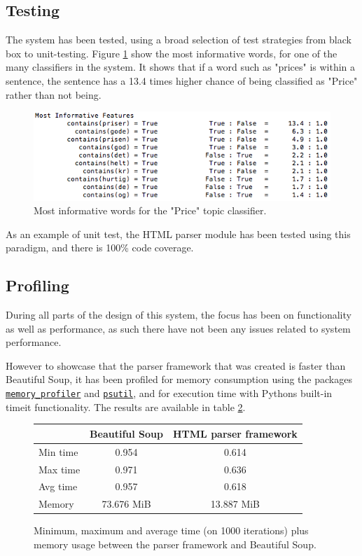 \documentclass[10pt]{IEEEtran}
\begin{document}
\subsection{Testing}
The system has been tested, using a broad selection of test strategies from black box to unit-testing.
Figure \ref{fig:classification} show the most informative words, for one of the many classifiers in the system. It shows that if a word such as "prices" is within a sentence, the sentence has a 13.4 times higher  chance of being classified as "Price" rather than not being.
\begin{figure}[h!]
	\centering
	\includegraphics[scale=0.48]{informative_priser.png}
	\caption{Most informative words for the "Price" topic classifier. \label{fig:classification}}
\end{figure}

As an example of unit test, the HTML parser module has been tested using this paradigm, and there is 100\% code coverage.

\subsection{Profiling}
During all parts of the design of this system, the focus has been on functionality as well as performance, as such there have not been any issues related to system performance.

However to showcase that the parser framework that was created is faster than Beautiful Soup, it has been profiled for memory consumption using the packages \href{https://pypi.python.org/pypi/memory\_profiler}{\texttt{memory\_profiler}} and \href{http://code.google.com/p/psutil/}{\texttt{psutil}}, and for execution time with Pythons built-in timeit functionality. The results are available in table \ref{fig:profiling}.

\begin{figure}[!h]
	\vspace*{2mm}
	\centering
	\begin{tabular}{ | l | c | c | }
  		\hline
   		 & \textbf{Beautiful Soup} & \textbf{HTML parser framework} \\ \hline
  		Min time & 0.954 & 0.614 \\ \hline
  		Max time & 0.971 & 0.636 \\ \hline
  		Avg time & 0.957 & 0.618 \\ \hline
  		Memory & 73.676 MiB & 13.887 MiB \\ \hline
	\end{tabular}
	\caption{Minimum, maximum and average time (on 1000 iterations) plus memory usage between the parser framework and Beautiful Soup. \label{fig:profiling}}
\end{figure}
\end{document}
